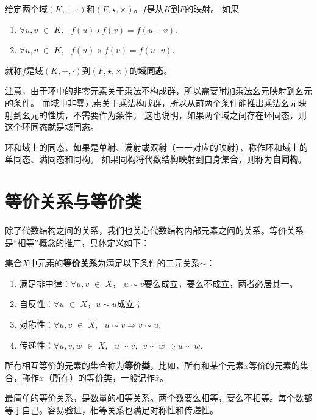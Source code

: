 \documentclass[12pt,UTF8,fontset=none]{ctexbook}
\begin{document}
\begin{appendix}
\begin{df}\label{df:0_6}
    给定两个域$(K, +, \cdot )$和$(F, \star , \times)$。$f$是从$K$到$F$的映射。
    如果
    \begin{enumerate}
        \item $\forall u, v \,\, \in \,\, K, \,\,\,\, f(u) \star f(v) = f(u + v).$
        \item $\forall u, v \,\, \in \,\, K, \,\,\,\, f(u) \times f(v) = f(u \cdot v).$
    \end{enumerate}
    就称$f$是域$(K, +, \cdot )$到$(F, \star , \times)$的\textbf{域同态}。
\end{df}

注意，由于环中的非零元素关于乘法不构成群，所以需要附加乘法幺元映射到幺元的条件。
而域中非零元素关于乘法构成群，所以从前两个条件能推出乘法幺元映射到幺元的性质，不需要作为条件。
这也说明，如果两个域之间存在环同态，则这个环同态就是域同态。

环和域上的同态，如果是单射、满射或双射（一一对应的映射），称作环和域上的单同态、满同态和同构。
如果同构将代数结构映射到自身集合，则称为\textbf{自同构}。

\section{等价关系与等价类}
除了代数结构之间的关系，我们也关心代数结构内部元素之间的关系。等价关系是“相等”概念的推广，具体定义如下：

\begin{df}\label{df:0_6b}
    集合$X$中元素的\textbf{等价关系}为满足以下条件的二元关系$\sim$：
    \begin{enumerate}
        \item 满足排中律：$\forall u, v \,\, \in \,\, X$， $u \sim v$要么成立，要么不成立，两者必居其一。
        \item 自反性：$\forall u \,\, \in \,\, X$，$u \sim u$成立；
        \item 对称性：$\forall u, v \,\, \in \,\, X, \,\,\,\, u \sim v \Rightarrow v \sim u.$
        \item 传递性：$\forall u, v, w \,\, \in \,\, X, \,\,\,\, u \sim v, \,\,\, v \sim w \Rightarrow u \sim w.$
    \end{enumerate}
\end{df}

所有相互等价的元素的集合称为\textbf{等价类}，比如，所有和某个元素$x$等价的元素的集合，称作$x$（所在）的等价类，一般记作$\bar{x}$。

最简单的等价关系，是数量的相等关系。两个数要么相等，要么不相等。每个数都等于自己。容易验证，相等关系也满足对称性和传递性。


\end{appendix}
\end{document}
